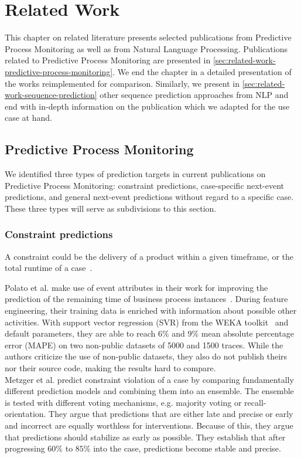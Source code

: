 \chapter{Related Work}\label{chap:related-work}
This chapter on related literature presents selected publications from Predictive Process Monitoring as well as from Natural Language Processing. Publications related to Predictive Process Monitoring are presented in \autoref{sec:related-work-predictive-process-monitoring}. We end the chapter in a detailed presentation of the works reimplemented for comparison. Similarly, we present in \autoref{sec:related-work-sequence-prediction} other sequence prediction approaches from NLP and end with in-depth information on the publication which we adapted for the use case at hand.

\section{Predictive Process Monitoring}\label{sec:related-work-predictive-process-monitoring}
We identified three types of prediction targets in current publications on Predictive Process Monitoring: constraint predictions, case-specific next-event predictions, and general next-event predictions without regard to a specific case. These three types will serve as subdivisions to this section.

\subsection*{Constraint predictions}
A constraint could be the delivery of a product within a given timeframe, or the total runtime of a case~\cite{weske2012business, francescomarino2015}.

Polato et al. make use of event attributes in their work for improving the prediction of the remaining time of business process instances~\cite{polato2014}. During feature engineering, their training data is enriched with information about possible other activities. With support vector regression (SVR) from the WEKA toolkit~\cite{web:weka} and default parameters, they are able to reach $6\%$ and $9\%$ mean absolute percentage error (MAPE) on two non-public datasets of 5000 and 1500 traces. While the authors criticize the use of non-public datasets, they also do not publish theirs nor their source code, making the results hard to compare.\\

Metzger et al. predict constraint violation of a case by comparing fundamentally different prediction models and combining them into an ensemble. The ensemble is tested with different voting mechanisms, e.g. majority voting or recall-orientation. They argue that predictions that are either late and precise or early and incorrect are equally worthless for interventions. Because of this, they argue that predictions should stabilize as early as possible. They establish that after progressing $60\%$ to $85\%$ into the case, predictions become stable and precise.

